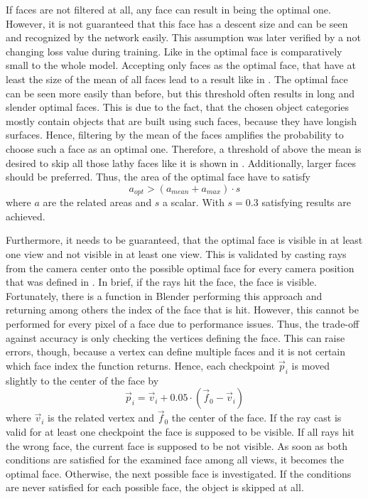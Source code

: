 If faces are not filtered at all, any face can result in being the optimal one.
However, it is not guaranteed that this face has a descent size and can be seen and recognized by the network easily.
This assumption was later verified by a not changing loss value during training.
Like in  the optimal face is comparatively small to the whole model.
Accepting only faces as the optimal face, that have at least the size of the mean of all faces lead to a result like in .
The optimal face can be seen more easily than before, but this threshold often results in long and slender optimal faces.
This is due to the fact, that the chosen object categories mostly contain objects that are built using such faces, because they have longish surfaces.
Hence, filtering by the mean of the faces amplifies the probability to choose such a face as an optimal one.
Therefore, a threshold of above the mean is desired to skip all those lathy faces like it is shown in .
Additionally, larger faces should be preferred.
Thus, the area of the optimal face have to satisfy
\begin{equation}
	a_{opt} > (a_{mean} + a_{max}) \cdot s
\end{equation}
where $a$ are the related areas and $s$ a scalar.
With $s = 0.3$ satisfying results are achieved.

Furthermore, it needs to be guaranteed, that the optimal face is visible in at least one view and not visible in at least one view.
This is validated by casting rays from the camera center onto the possible optimal face for every camera position that was defined in .
In brief, if the rays hit the face, the face is visible.
Fortunately, there is a function in Blender performing this approach and returning among others the index of the face that is hit.
However, this cannot be performed for every pixel of a face due to performance issues.
Thus, the trade-off against accuracy is only checking the vertices defining the face.
This can raise errors, though, because a vertex can define multiple faces and it is not certain which face index the function returns.
Hence, each checkpoint $\vec{p}_i$ is moved slightly to the center of the face by
\begin{equation}
	\vec{p}_i = \vec{v}_i + 0.05 \cdot (\vec{f}_0 - \vec{v}_i)
\end{equation}
where $\vec{v}_i$ is the related vertex and $\vec{f}_0$ the center of the face.
If the ray cast is valid for at least one checkpoint the face is supposed to be visible.
If all rays hit the wrong face, the current face is supposed to be not visible.
As soon as both conditions are satisfied for the examined face among all views, it becomes the optimal face.
Otherwise, the next possible face is investigated.
If the conditions are never satisfied for each possible face, the object is skipped at all.

